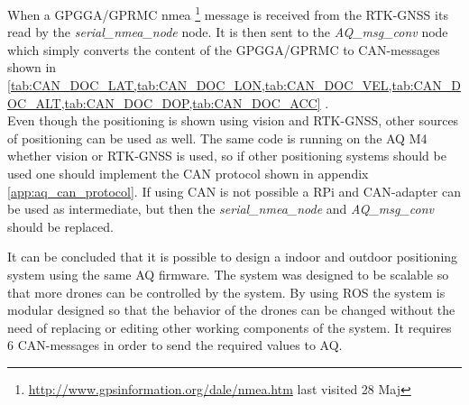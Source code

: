 When a GPGGA/GPRMC nmea \footnote{\url{http://www.gpsinformation.org/dale/nmea.htm} last visited 28 Maj} message is received from the \ac{RTK-GNSS} its read by the \textit{serial\_nmea\_node} node. It is then sent to the \textit{AQ\_msg\_conv} node which simply converts the content of the GPGGA/GPRMC to CAN-messages shown in \cref{tab:CAN_DOC_LAT,tab:CAN_DOC_LON,tab:CAN_DOC_VEL,tab:CAN_DOC_ALT,tab:CAN_DOC_DOP,tab:CAN_DOC_ACC}  . \\

Even though the positioning is shown using vision and \ac{RTK-GNSS}, other sources of positioning can be used as well. The same code is running on the \ac{AQ} M4 whether vision or \ac{RTK-GNSS} is used, so if other positioning systems should be used one should implement the \ac{CAN} protocol shown in appendix \ref{app:aq_can_protocol}.
If using \ac{CAN} is not possible a \ac{RPi} and \ac{CAN}-adapter can be used as intermediate, but then the \textit{serial\_nmea\_node} and \textit{AQ\_msg\_conv} should be replaced.


It can be concluded that it is possible to design a indoor and outdoor positioning system using the same \ac{AQ} firmware. The system was designed to be scalable so that more drones can be controlled by the system. By using ROS the system is modular designed so that the behavior of the drones can be changed without the need of replacing or editing other working components of the system. It requires 6 CAN-messages in order to send the required values to \ac{AQ}.